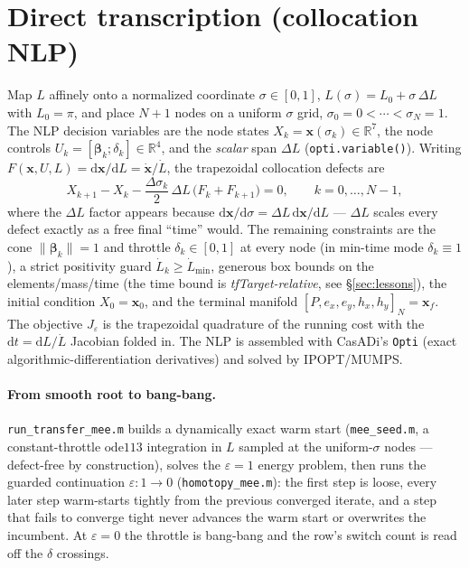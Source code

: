 \documentclass[11pt]{article}
\newcommand{\code}[1]{\texttt{\small #1}}
\newcommand{\file}[1]{\texttt{\small #1}}
\newcommand{\bv}{\boldsymbol{\beta}}
\newcommand{\xv}{\mathbf{x}}
\begin{document}
\section{Direct transcription (collocation NLP)}

Map $L$ affinely onto a normalized coordinate $\sigma\in[0,1]$,
$L(\sigma)=L_0+\sigma\,\Delta L$ with $L_0=\pi$, and place $N+1$ nodes on a uniform
$\sigma$ grid, $\sigma_0=0<\cdots<\sigma_N=1$. The NLP decision variables are the
node states $X_k=\xv(\sigma_k)\in\mathbb R^7$, the node controls
$U_k=[\bv_k;\delta_k]\in\mathbb R^4$, and the \emph{scalar} span $\Delta L$
(\code{opti.variable()}). Writing $F(\xv,U,L)=\mathrm{d}\xv/\mathrm{d}L
=\dot{\xv}/\dot L$, the trapezoidal collocation defects are
\begin{equation}
X_{k+1}-X_k-\frac{\Delta\sigma_k}{2}\,\Delta L\,\big(F_k+F_{k+1}\big)=0,
\qquad k=0,\dots,N-1,
\label{eq:defect}
\end{equation}
where the $\Delta L$ factor appears because $\mathrm{d}\xv/\mathrm{d}\sigma
=\Delta L\,\mathrm{d}\xv/\mathrm{d}L$ --- $\Delta L$ scales every defect exactly as
a free final ``time'' would. The remaining constraints are the cone
$\lVert\bv_k\rVert=1$ and throttle $\delta_k\in[0,1]$ at every node (in min-time
mode $\delta_k\equiv1$), a strict positivity guard $\dot L_k\ge \dot L_{\min}$,
generous box bounds on the elements/mass/time (the time bound is
\emph{tfTarget-relative}, see \S\ref{sec:lessons}), the initial condition
$X_0=\xv_0$, and the terminal manifold $[P,e_x,e_y,h_x,h_y]_N=\xv_f$. The
objective $J_\varepsilon$ is the trapezoidal quadrature of the running cost with
the $\mathrm{d}t=\mathrm{d}L/\dot L$ Jacobian folded in. The NLP is assembled with
CasADi's \code{Opti} (exact algorithmic-differentiation derivatives) and solved by
IPOPT/MUMPS.

\paragraph{From smooth root to bang-bang.} \file{run\_transfer\_mee.m} builds a
dynamically exact warm start (\file{mee\_seed.m}, a constant-throttle
$\mathrm{ode113}$ integration in $L$ sampled at the uniform-$\sigma$ nodes ---
defect-free by construction), solves the $\varepsilon=1$ energy problem, then runs
the guarded continuation $\varepsilon:1\to0$ (\file{homotopy\_mee.m}): the first
step is loose, every later step warm-starts tightly from the previous converged
iterate, and a step that fails to converge tight never advances the warm start or
overwrites the incumbent. At $\varepsilon=0$ the throttle is bang-bang and the
row's switch count is read off the $\delta$ crossings.
\end{document}
